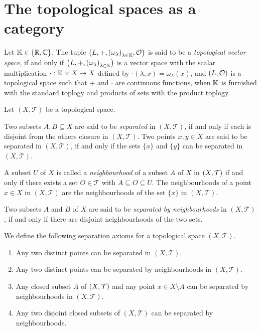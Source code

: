 \section{The topological spaces as a category}


\begin{definition}
	Let $\mathbb K \in {\left \{ \mathbb R, \mathbb C\right \}}$. The tuple $\tvspace{\K}$ is said to be a \textit{topological vector space}, if and only if ${\left ( L, +, {\left ( \omega_\lambda \right )}_{\lambda \in \mathbb K} \right )}$ is a vector space with the scalar multiplication $\cdot: \mathbb K \times X \to X$ defined by $\cdot(\lambda, x) = \omega_\lambda(x)$, and $\tspace[L][O]$ is a topological space such that $+$ and $\cdot$ are continuous functions, when $\mathbb K$ is furnished with the standard toplogy and products of sets with the product toplogy.
\end{definition}

\begin{definition}
	Let $(X, \mathcal{T})$ be a topological space. 
	
	Two subsets $A,B \subseteq X$ are said to be \textit{separated} in $(X, \mathcal{T})$, if and only if each is disjoint from the others closure in $(X, \mathcal{T})$. Two points $x,y \in X$ are said to be separated in $(X, \mathcal{T})$, if and only if the sets $\{x\}$ and $\{y\}$ can be separated in $(X, \mathcal{T})$.
	
	A subset $U$ of $X$ is called a \textit{neighbourhood} of a subset $A$ of $X$ in $\tspace$ if and only if there exists a set $O \in \mathcal{T}$ with $A \subseteq O \subseteq U$. The neighbourhoods of a point $x \in X$ in $(X, \mathcal{T})$ are the neighbourhoods of the set $\{x\}$ in $(X, \mathcal{T})$.
	
	Two subsets $A$ and $B$ of $X$ are said to be \textit{separated by neighbourhoods} in $(X, \mathcal{T})$, if and only if there are disjoint neighbourhoods of the two sets. 
\end{definition}

\begin{definition}
	We define the following separation axioms for a topological space $(X, \mathcal{T})$.
	\begin{enumerate}[label= $(T_\arabic*)$]
		\item \label{axiom:t1} Any two distinct points can be separated in $(X, \mathcal{T})$. 
		
		\item \label{axiom:t2} Any two distinct points can be separated by neighbourhoods in $(X, \mathcal{T})$. 
		
		\item \label{axiom:t3} Any closed subset $A$ of $\tspace$ and any point $x \in X\setminus A$ can be separated by neighbourhoods in $(X, \mathcal{T})$. 
		
		\item \label{axiom:t4} Any two disjoint closed subsets of $(X, \mathcal{T})$ can be separated by neighbourhoods. 
	\end{enumerate}
\end{definition}

